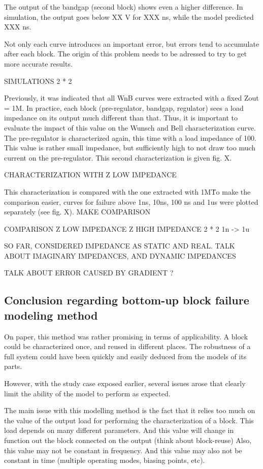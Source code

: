 The output of the bandgap (second block) shows even a higher difference.
In simulation, the output goes below XX V for XXX ns, while the model predicted XXX ns.

Not only each curve introduces an important error, but errors tend to accumulate after each block.
The origin of this problem needs to be adressed to try to get more accurate results.

SIMULATIONS 2 * 2

Previously, it was indicated that all WnB curves were extracted with a fixed Zout = 1M\textOmega.
In practice, each block (pre-regulator, bandgap, regulator) sees a load impedance on its output much different than that.
Thus, it is important to evaluate the impact of this value on the Wunsch and Bell characterization curve.
The pre-regulator is characterized again, this time with a load impedance of 100\textOmega.
This value is rather small impedance, but sufficiently high to not draw too much current on the pre-regulator.
This second characterization is given fig. X.

CHARACTERIZATION WITH Z LOW IMPEDANCE

This characterization is compared with the one extracted with 1M\textOmega\.
To make the comparison easier, curves for failure above 1ns, 10ns, 100 ns and 1us were plotted separately (see fig. X).
MAKE COMPARISON

COMPARISON Z LOW IMPEDANCE Z HIGH IMPEDANCE 2 * 2 1n -> 1u

SO FAR, CONSIDERED IMPEDANCE AS STATIC AND REAL.
TALK ABOUT IMAGINARY IMPEDANCES, AND DYNAMIC IMPEDANCES

TALK ABOUT ERROR CAUSED BY GRADIENT ?


\subsection{Conclusion regarding bottom-up block failure modeling method}

On paper, this method was rather promising in terms of applicability.
A block could be characterized once, and reused in different places.
The robustness of a full system could have been quickly and easily deduced from the models of its parts.

However, with the study case exposed earlier, several issues arose that clearly limit the ability of the model to perform as expected.

The main issue with this modelling method is the fact that it relies too much
on the value of the output load for performing the characterization of a block.
This load depends on many different parameters.
And this value will change in function out the block connected on the output (think about block-reuse)
Also, this value may not be constant in frequency.
And this value may also not be constant in time (multiple operating modes, biasing points, etc).


